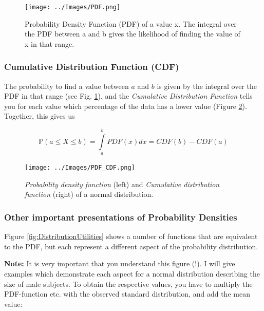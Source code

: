\begin{figure}
  \centering
  \texttt{[image: ../Images/PDF.png]}\\
  \caption{Probability Density Function (PDF) of a value x. The integral over the PDF between a and b gives the likelihood of finding the value of x in that range.}\label{fig:PDF}
\end{figure}

\subsubsection{Cumulative Distribution Function (CDF)}

The probability to find a value between $a$ and $b$ is given by the integral over the PDF in that range (see Fig. \ref{fig:PDF}), and the \emph{Cumulative Distribution Function} tells you for each value which percentage of the data has a lower value (Figure \ref{fig:CDF}). Together, this gives us

\begin{equation}
   \mathbb{P}(a \leq X \leq b) = \int\limits_a^b {PDF(x)dx} = CDF(b) - CDF(a)
\end{equation}


\begin{figure}[ht]
  \centering
  \texttt{[image: ../Images/PDF\_CDF.png]}\\
  \caption{\emph{Probability density function} (left) and \emph{Cumulative distribution function} (right) of a normal distribution.}\label{fig:CDF}
\end{figure}

\subsubsection{Other important presentations of Probability Densities}

Figure \ref{fig:DistributionUtilities} shows a number of functions that are equivalent to the PDF, but each represent a different aspect of the probability distribution.

\textbf{Note: }It is very important that you understand this figure (!). I will give examples which demonstrate each aspect for a normal distribution describing the size of male subjects. To obtain the respective values, you have to multiply the PDF-function etc. with the observed standard distribution, and add the mean value:

